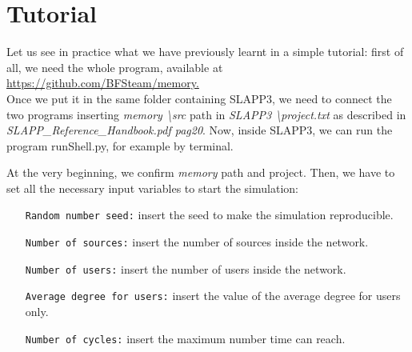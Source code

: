 \section{Tutorial}
Let us see in practice what we have previously learnt in a simple tutorial: first of all, we need the whole program, available at \url{https://github.com/BFSteam/memory.}\\
Once we put it in the same folder containing SLAPP3, we need to connect the two programs inserting \textit{memory \textbackslash src} path in \textit{SLAPP3 \textbackslash project.txt} as described in 
\\ \textit{SLAPP\_Reference\_Handbook.pdf pag20}.
Now, inside SLAPP3, we can run the program runShell.py, for example by terminal.

At the very beginning, we confirm \textit{memory} path and project. Then, we have to set all the necessary input variables to start the simulation:
\begin{itemize}
\item[\texttt{Random number seed:}] insert the seed to make the simulation reproducible.
\item[\texttt{Number of sources:}]insert the number of sources inside the network.
\item[\texttt{Number of users:}]insert the number of users inside the network.
\item[\texttt{Average degree for users:}]insert the value of the average degree for users only.
\item[\texttt{Number of cycles:}]insert the maximum number time can reach.
\end{itemize}


